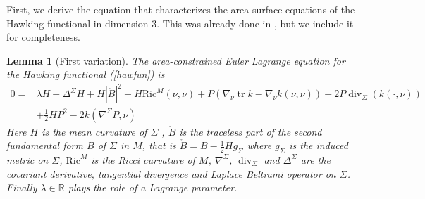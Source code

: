\documentclass[12pt,a4paper]{amsart}
\theoremstyle{plain}
\newtheorem{lemma}[theorem]{Lemma}
\theoremstyle{definition}
\newcommand{\diver}{\operatorname{div}}
\newcommand{\tr}{\operatorname{tr}}
\begin{document}
 First, we derive the equation that characterizes the area surface equations of the Hawking functional in dimension $3$. This was already done in \cite[Lemma 2.1]{diaz2023local}, but we include it for completeness.
\begin{lemma}[First variation]
The area-constrained Euler Lagrange equation for the Hawking functional (\ref{hawfun}) is 
\begin{equation}\label{eulag}
\begin{split}
   0=& \lambda H  +\Delta^\Sigma H + H|\mathring{B}|^2+ H \mathrm{Ric}^M(\nu, \nu)+P( \nabla_\nu \tr k - \nabla_\nu k(\nu,\nu )) - 2P \diver_\Sigma (k(\cdot, \nu))\\ & +\frac{1}{2}H P^2 - 2k (\nabla^\Sigma P, \nu )
    \end{split}
\end{equation}
Here $H$ is the mean curvature of $\Sigma$ , $\mathring{B}$   is the traceless part of the second
fundamental form $B$ of $\Sigma$ in $M$, that is
$\mathring{B}= B- \frac{1}{2} H g_\Sigma$ where $g_\Sigma$ is the induced
metric on $\Sigma$,  $\mathrm{Ric}^M $ is the Ricci curvature of $M$, $\nabla^\Sigma $, $\diver_\Sigma$ and $\Delta^\Sigma$ are the covariant derivative, tangential divergence  and Laplace Beltrami operator on $\Sigma$. Finally $\lambda \in \mathbb{R}$ plays the role of a Lagrange parameter.
\end{lemma}
\end{document}
